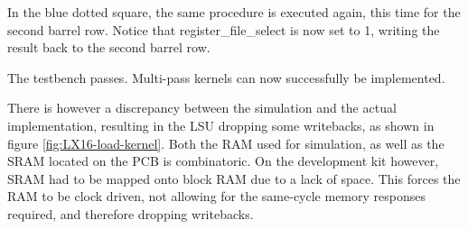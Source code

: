 \documentclass[../main/report.tex]{subfiles}
\begin{document}
In the blue dotted square, the same procedure is executed again, this time for the second barrel row.
Notice that register\_file\_select is now set to 1, writing the result back to the second barrel row.

The testbench passes. Multi-pass kernels can now successfully be implemented.

There is however a discrepancy between the simulation and the actual implementation, resulting in the LSU dropping some writebacks, as shown in figure \ref{fig:LX16-load-kernel}.
Both the RAM used for simulation, as well as the SRAM located on the PCB is combinatoric.
On the development kit however, SRAM had to be mapped onto block RAM due to a lack of space.
This forces the RAM to be clock driven, not allowing for the same-cycle memory responses required, and therefore dropping writebacks.




\end{document}
